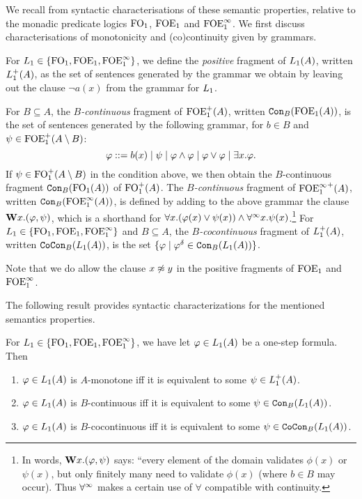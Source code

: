 We recall from \cite{carr:mode18} syntactic characterisations of 
these semantic properties, relative to the monadic predicate logics $\ofo$, 
$\ofoe$ and $\ofoei$. 
We first discuss characterisations of monotonicity and (co)continuity given by
grammars. 

\begin{definition}
For $\oslang \in \{ \ofo, \ofoe, \ofoei \}$, we define the \emph{positive} 
fragment of $\oslang(A)$, written $\oslang^{+}(A)$, as the set of sentences 
generated by the grammar we obtain by leaving out the clause $\lnot a(x)$
from the grammar for $\oslang$.
 
For $B \subseteq A$, the \emph{$B$-continuous} fragment of $\ofoe^{+}(A)$, 
written $\cont{\ofoe(A)}{B}$, is the set of sentences generated by the following
grammar, for $b \in B$ and $\psi \in \ofoe^{+}(A \setminus B)$:
\[
\phi \isbnf  b(x) \mid \psi \mid \phi \land \phi \mid \phi \lor \phi 
   \mid \exists x.\phi.
\]
If $\psi \in \ofo^{+}(A \setminus B)$ in the condition above, we then obtain the
$B$-continuous fragment $\cont{\ofo(A)}{B}$ of $\ofo^{+}(A)$.
The  \emph{$B$-continuous} fragment of ${\ofoei}^{+}(A)$, written 
$\cont{\ofoei(A)}{B}$, is defined by adding to the above grammar the clause 
$\wqu x.(\phi,\psi)$, which is a shorthand for $\forall x.(\phi(x) \lor \psi(x)) 
\land \dqu x.\psi(x)$.\footnote{In words, 
   $\wqu x.(\phi,\psi)$ says: ``every element of the domain validates $\phi(x)$ 
   or $\psi(x)$, but only finitely many need to validate $\phi(x)$ (where $b \in 
   B$ may occur). Thus $\dqu$ makes a certain use of $\forall$ compatible with 
   continuity.}
For $\oslang \in \{ \ofo, \ofoe,\ofoei \}$ and $B \subseteq A$, the 
\emph{$B$-cocontinuous} fragment of $\oslang^{+}(A)$, written 
$\cocont{\oslang(A)}{B}$, is the set $\{\phi \mid \phi^\delta \in 
\cont{\oslang(A)}{B}\}$.
\end{definition}

Note that we do allow the clause $x \not\foeq y$ in the positive fragments of 
$\ofoe$ and $\ofoei$.

The following result provides syntactic characterizations for the mentioned 
semantics properties.

\begin{theorem} 
    \label{th:onesteplogics-grammars}
For $\oslang \in \{\ofo, \ofoe,\ofoei \}$, we have 
let $\phi \in \oslang(A)$ be 
a one-step formula.
Then

\begin{enumerate}[(1)]
\item
$\phi \in \oslang(A)$ is $A$-monotone iff it is equivalent to some 
$\psi \in \oslang^{+}(A)$. 

\item
$\phi \in \oslang(A)$ is $B$-continuous iff it is equivalent to some $\psi \in
\cont{\oslang(A)}{B}$. 

\item
$\phi \in \oslang(A)$ is $B$-cocontinuous iff it is equivalent to some $\psi \in
\cocont{\oslang(A)}{B}$. 
\end{enumerate}
\end{theorem}

